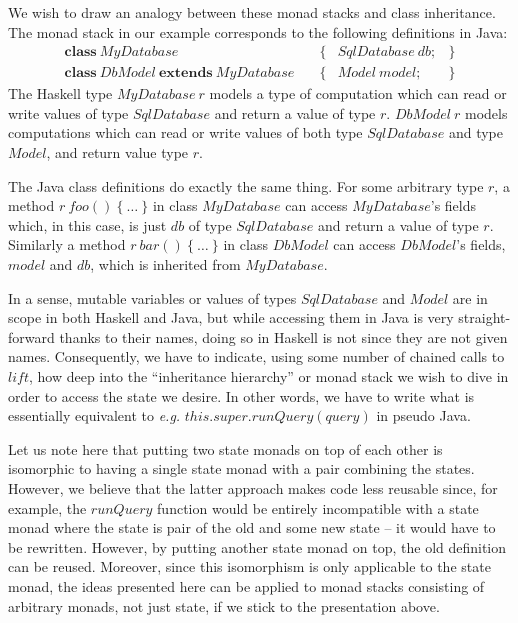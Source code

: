 We wish to draw an analogy between these monad stacks and class inheritance. The monad stack in our example corresponds to the following definitions in Java:
\begin{displaymath}
\begin{array}{lclc}
\mathbf{class}~\mathit{MyDatabase} & \quad \{ & \mathit{SqlDatabase}~\mathit{db}; & \} \\
\mathbf{class}~\mathit{DbModel}~\mathbf{extends}~\mathit{MyDatabase} & \quad \{ & \mathit{Model}~\mathit{model}; & \}
\end{array}
\end{displaymath}
The Haskell type $\mathit{MyDatabase}~r$ models a type of computation which can read or write values of type $\mathit{SqlDatabase}$ and return a value of type $r$. $\mathit{DbModel}~r$ models computations which can read or write values of both type $\mathit{SqlDatabase}$ and type $\mathit{Model}$, and return value type $r$.

The Java class definitions do exactly the same thing. For some arbitrary type $r$, a method $r~\mathit{foo}()~\{~\ldots~\}$ in class $\mathit{MyDatabase}$ can access $\mathit{MyDatabase}$'s fields which, in this case, is just $\mathit{db}$ of type $\mathit{SqlDatabase}$ and return a value of type $r$.  Similarly a method $r~\mathit{bar}()~\{~\ldots~\}$ in class $\mathit{DbModel}$ can access $\mathit{DbModel}$'s fields, $\mathit{model}$ and $\mathit{db}$, which is inherited from $\mathit{MyDatabase}$. 

In a sense, mutable variables or values of types $\mathit{SqlDatabase}$ and $\mathit{Model}$ are in scope in both Haskell and Java, but while accessing them in Java is very straight-forward thanks to their names, doing so in Haskell is not since they are not given names. Consequently, we have to indicate, using some number of chained calls to $\mathit{lift}$, how deep into the ``inheritance hierarchy'' or monad stack we wish to dive in order to access the state we desire. In other words, we have to write what is essentially equivalent to \emph{e.g.} $\mathit{this}.\mathit{super}.\mathit{runQuery}(\mathit{query})$ in pseudo Java. 

Let us note here that putting two state monads on top of each other is isomorphic to having a single state monad with a pair combining the states. However, we believe that the latter approach makes code less reusable since, for example, the $\mathit{runQuery}$ function would be entirely incompatible with a state monad where the state is pair of the old and some new state -- it would have to be rewritten. However, by putting another state monad on top, the old definition can be reused. Moreover, since this isomorphism is only applicable to the state monad, the ideas presented here can be applied to monad stacks consisting of arbitrary monads, not just state, if we stick to the presentation above. 

